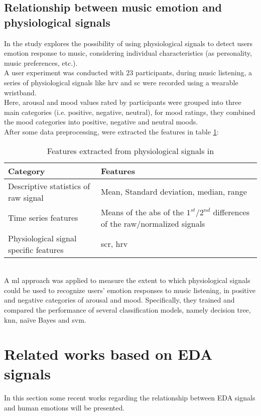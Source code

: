 \subsection{Relationship between music emotion and physiological signals}
In \cite{hu2018relationships} the study explores the possibility of using physiological signals to detect users emotion response to music, considering individual characteristics (as personality, music preferences, etc.).
\\ \indent
A user experiment was conducted with $23$ participants, during music listening, a series of physiological signals like \gls{hrv} and \gls{sc} were recorded using a wearable wristband.
\\ Here, arousal and mood values rated by participants were grouped into three main categories (i.e. positive, negative, neutral), for mood ratings, they combined the mood categories into positive, negative and neutral moods.
\\
After some data preprocessing, were extracted the features in table \ref{table:features_hu2018}:
\begin{table}[h!]
	\centering
	\begin{tabular}{|p{}|p{}|}
		\hline
		Category & Features\\ [0.5ex] 
		\hline \hline Descriptive statistics of raw signal & Mean, Standard deviation, median, range \\
		\hline Time series features & Means of the abs of the $1^{st}$/$2^{nd}$ differences of the raw/normalized signals \\
		\hline Physiological signal specific features & \gls{scr}, \gls{hrv} \\
		\hline
	\end{tabular}
	\caption{Features extracted from physiological signals in \cite{hu2018relationships}}
	\label{table:features_hu2018}
\end{table}
\\
A \gls{ml} approach was applied to measure the extent to which physiological signals could be used to recognize users’ emotion responses to music listening, in positive and negative categories of arousal and mood. Specifically, they trained and compared the performance of several classification models, namely decision tree, \gls{knn}, naïve Bayes and \gls{svm}.

\section{Related works based on EDA signals}
In this section some recent works regarding the relationship between EDA signals and human emotions will be presented. 

